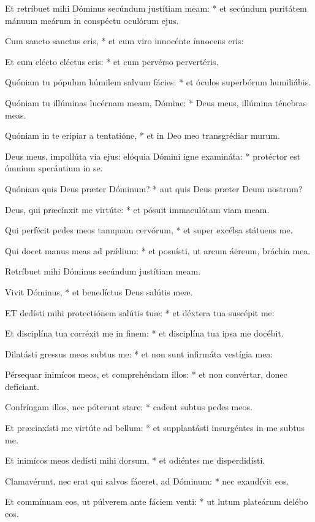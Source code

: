 Et retríbuet mihi Dóminus secúndum justítiam meam: * et secúndum puritátem mánuum meárum in conspéctu oculórum ejus.

Cum sancto sanctus eris, * et cum viro innocénte ínnocens eris:

Et cum elécto eléctus eris: * et cum pervérso pervertéris.

Quóniam tu pópulum húmilem salvum fácies: * et óculos superbórum humiliábis.

Quóniam tu illúminas lucérnam meam, Dómine: * Deus meus, illúmina ténebras meas.

Quóniam in te erípiar a tentatióne, * et in Deo meo transgrédiar murum.

Deus meus, impollúta via ejus: elóquia Dómini igne examináta: * protéctor est ómnium sperántium in se.

Quóniam quis Deus præter Dóminum? * aut quis Deus præter Deum nostrum?

Deus, qui præcínxit me virtúte: * et pósuit immaculátam viam meam.

Qui perfécit pedes meos tamquam cervórum, * et super excélsa státuens me.

Qui docet manus meas ad prǽlium: * et posuísti, ut arcum áëreum, bráchia mea.

 Retríbuet mihi Dóminus secúndum justítiam meam.

 Vivit Dóminus, * et benedíctus Deus salútis meæ.


\lettrine[lines=2]{E}{T} dedísti mihi protectiónem salútis tuæ: * et déxtera tua suscépit me:

Et disciplína tua corréxit me in finem: * et disciplína tua ipsa me docébit.

Dilatásti gressus meos subtus me: * et non sunt infirmáta vestígia mea:

Pérsequar inimícos meos, et comprehéndam illos: * et non convértar, donec defíciant.

Confríngam illos, nec póterunt stare: * cadent subtus pedes meos.

Et præcinxísti me virtúte ad bellum: * et supplantásti insurgéntes in me subtus me.

Et inimícos meos dedísti mihi dorsum, * et odiéntes me disperdidísti.

Clamavérunt, nec erat qui salvos fáceret, ad Dóminum: * nec exaudívit eos.

Et commínuam eos, ut púlverem ante fáciem venti: * ut lutum plateárum delébo eos.

